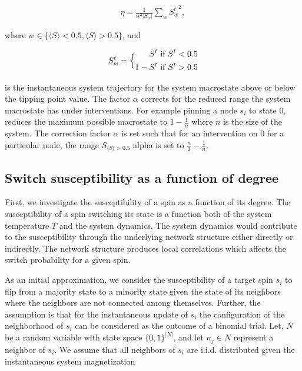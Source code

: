 \documentclass[a4paper, 11pt, twocolumn]{article}
\begin{document}
\begin{equation*}
\label{eq:noise}
\begin{split}
\eta = \frac{1}{\alpha^2 |S_{w}|}  \sum_w {S_w^t}^2,
\end{split}
\end{equation*}


where \(w \in \{\langle S \rangle < 0.5,\langle S \rangle > 0.5\}\), and

\begin{equation}
\label{eq:noise_estimation}
S_{w}^{t} = \Bigl\{\begin{aligned}
    S^t & \textrm{ if } S^t < 0.5 \\
    1 - S^t & \textrm{ if } S^t > 0.5
    \end{aligned}
\end{equation}

is the instantaneous system trajectory for the system macrostate above
or below the tipping point value. The factor \(\alpha\) corrects for the
reduced range the system macrostate has under interventions. For example
pinning a node \(s_i\) to state 0, reduces the maximum possible
macrostate to \(1 - \frac{1}{n}\) where \(n\) is the size of the system.
The correction factor \(\alpha\) is set such that for an intervention on
0 for a particular node, the range \(S_{\langle S \rangle > 0.5}\)
alpha is set to \(\frac{n}{2} - \frac{1}{n}\).

\subsection{Switch susceptibility as a function of degree}
\label{sec:org009e10c}
First, we investigate the susceptibility of a spin as a function of its
degree. The susceptibility of a spin switching its state is a function
both of the system temperature \(T\) and the system dynamics. The system
dynamics would contribute to the susceptibility through the underlying
network structure either directly or indirectly. The network structure
produces local correlations which affects the switch probability for a
given spin.

As an initial approximation, we consider the susceptibility of a target
spin \(s_i\) to flip from a majority state to a minority state given the
state of its neighbors where the neighbors are not connected among
themselves. Further, the assumption is that for the instantaneous update
of \(s_i\) the configuration of the neighborhood of \(s_i\) can be
considered as the outcome of a binomial trial. Let, \(N\) be a random
variable with state space \(\{0,  1\}^{|N|}\), and let \(n_j \in N\)
represent a neighbor of \(s_i\). We assume that all neighbors of \(s_i\)
are i.i.d. distributed given the instantaneous system magnetization
\end{document}
